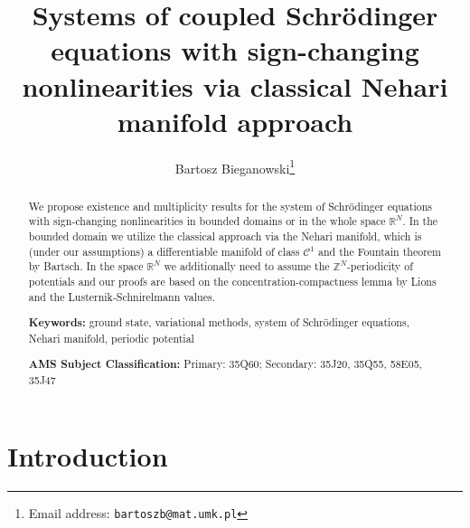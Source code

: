 \documentclass{scrartcl}
\newcommand{\cC}{{\mathcal C}}
\newcommand{\R}{\mathbb{R}}
\numberwithin{equation}{section}
\begin{document}
\title{Systems of coupled Schr\"odinger equations with sign-changing nonlinearities via classical Nehari manifold approach}

\author{Bartosz Bieganowski\thanks{Email address: \texttt{bartoszb@mat.umk.pl}}}

\maketitle

\begin{abstract} 
We propose existence and multiplicity results for the system of Schr\"{o}dinger equations with sign-changing nonlinearities in bounded domains or in the whole space $\R^N$. In the bounded domain we utilize the classical approach via the Nehari manifold, which is (under our assumptions) a differentiable manifold of class $\cC^1$ and the Fountain theorem by Bartsch. In the space $\R^N$ we additionally need to assume the $\mathbb{Z}^N$-periodicity of potentials and our proofs are based on the concentration-compactness lemma by Lions and the Lusternik-Schnirelmann values. 
\medskip

\noindent \textbf{Keywords:} ground state, variational methods, system of Schr\"odinger equations, Nehari manifold, periodic potential
   
\noindent \textbf{AMS Subject Classification:}  Primary: 35Q60; Secondary: 35J20, 35Q55, 58E05, 35J47
\end{abstract}

\section{Introduction}
\setcounter{section}{1}
\end{document}
